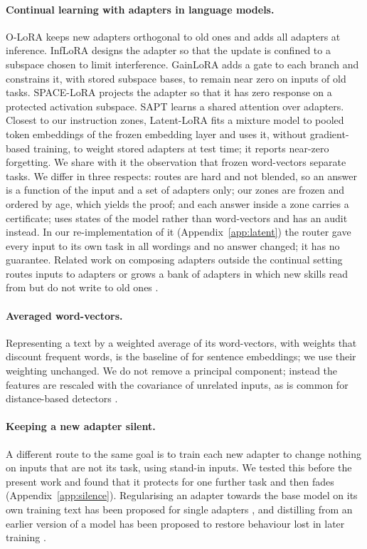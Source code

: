 \paragraph{Continual learning with adapters in language models.} O-LoRA \citep{wang2023olora} keeps
new adapters orthogonal to old ones and adds all adapters at inference. InfLoRA
\citep{liang2024inflora} designs the adapter so that the update is confined to a subspace chosen to
limit interference. GainLoRA \citep{liang2025gainlora} adds a gate to each branch and constrains it,
with stored subspace bases, to remain near zero on inputs of old tasks. SPACE-LoRA
\citep{spacelora2026} projects the adapter so that it has zero response on a protected activation
subspace. SAPT \citep{zhao2024sapt} learns a shared attention over adapters. Closest to our
instruction zones, Latent-LoRA \citep{latentlora2026} fits a mixture model to pooled token embeddings
of the frozen embedding layer and uses it, without gradient-based training, to weight stored
adapters at test time; it reports near-zero forgetting. We share with it the observation that
frozen word-vectors separate tasks. We differ in three respects: routes are hard and not blended,
so an answer is a function of the input and a set of adapters only; our zones are frozen and ordered by
age, which yields the proof; and each answer inside a zone carries a certificate; \recog{} uses
states of the model rather than word-vectors and has an audit instead. In our re-implementation of it (Appendix~\ref{app:latent}) the
router gave every input to its own task in all wordings and no answer changed; it has no guarantee.
Related work on composing
adapters outside the continual setting routes inputs to adapters \citep{lorauter2026,logo2025} or
grows a bank of adapters in which new skills read from but do not write to old ones
\citep{read2026}.

\paragraph{Averaged word-vectors.} Representing a text by a weighted average of its word-vectors,
with weights that discount frequent words, is the baseline of \citet{arora2017simple} for sentence
embeddings; we use their weighting unchanged. We do not remove a principal component; instead the
features are rescaled with the covariance of unrelated inputs, as is common for distance-based
detectors \citep{lee2018mahalanobis}.

\paragraph{Keeping a new adapter silent.} A different route to the same goal is to train each new
adapter to change nothing on inputs that are not its task, using stand-in inputs. We tested this
before the present work and found that it protects for one further task and then fades
(Appendix~\ref{app:silence}). Regularising an adapter towards the base model on its own training
text has been proposed for single adapters \citep{maskthetarget2026}, and distilling from an earlier
version of a model has been proposed to restore behaviour lost in later training
\citep{lu2025onpolicy}.
